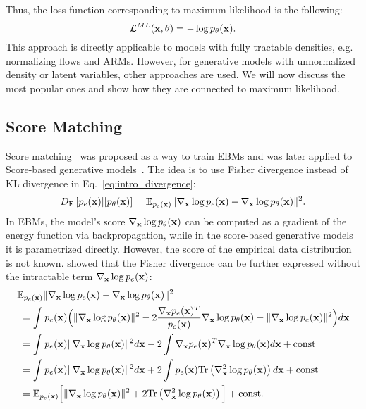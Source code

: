 Thus, the loss function corresponding to maximum likelihood is the following:
\begin{equation}
    \mathcal{L}^{ML}({\mathbf{x}}, \theta) = -\log p_{\theta}({\mathbf{x}}).
\end{equation}
This approach is directly applicable to models with fully tractable densities, e.g. normalizing flows and ARMs. However, for generative models with unnormalized density or latent variables, other approaches are used. 
We will now discuss the most popular ones and show how they are connected to maximum likelihood.

\subsection{Score Matching}
Score matching~\citep{hyvarinen2005estimation} was proposed as a way to train EBMs and was later applied to Score-based generative models~\citep{song2019generative}. The idea is to use Fisher divergence instead of KL divergence in Eq.~\ref{eq:intro_divergence}:
\begin{equation}\label{eq:score_divergence}
\begin{aligned}
D_{\text{F}}\left[p_{e}(\rvx)||p_{\theta}(\rvx)\right]  =  \E_{p_{e}(\rvx)}\|\nabla_{\rvx} \log p_{e}(\rvx) - \nabla_{\rvx}\log p_{\theta}(\rvx)\|^2.
\end{aligned}
\end{equation}
In EBMs, the model's score $\nabla_{{\mathbf{x}}}\log p_{\theta}({\mathbf{x}})$ can be computed as a gradient of the energy function via backpropagation, while in the score-based generative models it is parametrized directly. However, the score of the empirical data distribution is not known. 
\citet{hyvarinen2005estimation} showed that the Fisher divergence can be further expressed without the intractable term $\nabla_{{\mathbf{x}}} \log p_{e}({\mathbf{x}})$: 
\begin{align}
&\E_{p_{e}(\rvx)}\|\nabla_{\rvx} \log p_{e}(\rvx) - \nabla_{\rvx}\log p_{\theta}(\rvx)\|^2 \notag \\
 &\;= \int p_e(\rvx) \Big(\|\nabla_{\rvx}\log p_{\theta}(\rvx)\|^2 - 2 \frac{\nabla_{\rvx}p_{e}(\rvx)^T}{p_{e}(\rvx)} \nabla_{\rvx}\log p_{\theta}(\rvx)  + \|\nabla_{\rvx} \log p_{e}(\rvx)\|^2 \Big)d\rvx \notag \\
&\;= \int p_e(\rvx) \|\nabla_{\rvx}\log p_{\theta}(\rvx)\|^2d\rvx 
    - 2 \int \nabla_{\rvx}p_{e}(\rvx)^T \nabla_{\rvx}\log p_{\theta}(\rvx)d\rvx  + \text{const}  \label{eq:sm_2}\\
&\;= \int  p_e(\rvx) \|\nabla_{\rvx}\log p_{\theta}(\rvx)\|^2d\rvx 
    + 2 \int p_{e}(\rvx) \text{Tr}\left(\nabla^2_{\rvx}\log p_{\theta}(\rvx)\right)d\rvx  + \text{const} \label{eq:sm_3} \\
&\;= \E_{p_e(\rvx)} \Big[ \|\nabla_{\rvx}\log p_{\theta}(\rvx)\|^2 
    + 2 \text{Tr}\left(\nabla^2_{\rvx}\log p_{\theta}(\rvx)\right)\Big]  + \text{const}. \label{eq:sm_4}     
\end{align}
